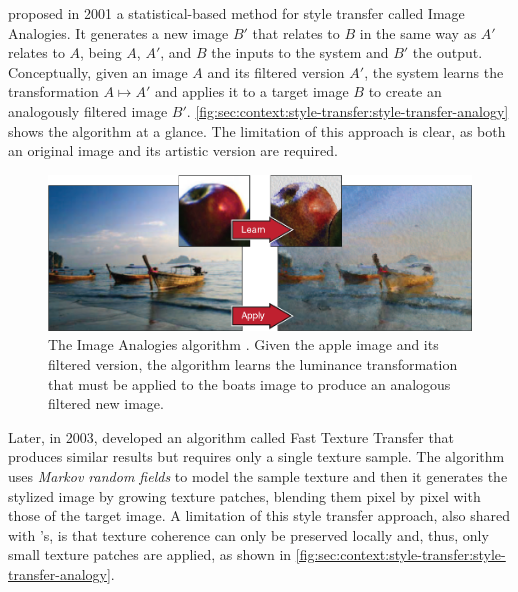 \citet{Hertzmann2001} proposed in 2001 a statistical-based method for style transfer called Image Analogies.
It generates a new image $B'$ that relates to $B$ in the same way as $A'$ relates to $A$, being $A$, $A'$, and $B$ the inputs to the system and $B'$ the output.
Conceptually, given an image $A$ and its filtered version $A'$, the system learns the transformation $A \mapsto A'$ and applies it to a target image $B$ to create an analogously filtered image $B'$.
\autoref{fig:sec:context:style-transfer:style-transfer-analogy} shows the algorithm at a glance.
The limitation of this approach is clear, as both an original image and its artistic version are required.

\begin{figure}[htbp]
  \includegraphics[width=\textwidth]{gfx/style-transfer-analogy}
  \caption{
    The Image Analogies algorithm \cite{Hertzmann2001}.
    Given the apple image and its filtered version, the algorithm learns the luminance transformation that must be applied to the boats image to produce an analogous filtered new image.
  }
  \label{fig:sec:context:style-transfer:style-transfer-analogy}
\end{figure}

Later, in 2003, \citet{Ashikhmin2003} developed an algorithm called Fast Texture Transfer that produces similar results but requires only a single texture sample.
The algorithm uses \emph{Markov random fields} to model the sample texture and then it generates the stylized image by growing texture patches, blending them pixel by pixel with those of the target image.
A limitation of this style transfer approach, also shared with \citeauthor{Hertzmann2001}'s, is that texture coherence can only be preserved locally \cite{Lee2010} and, thus, only small texture patches are applied, as shown in \autoref{fig:sec:context:style-transfer:style-transfer-analogy}.

